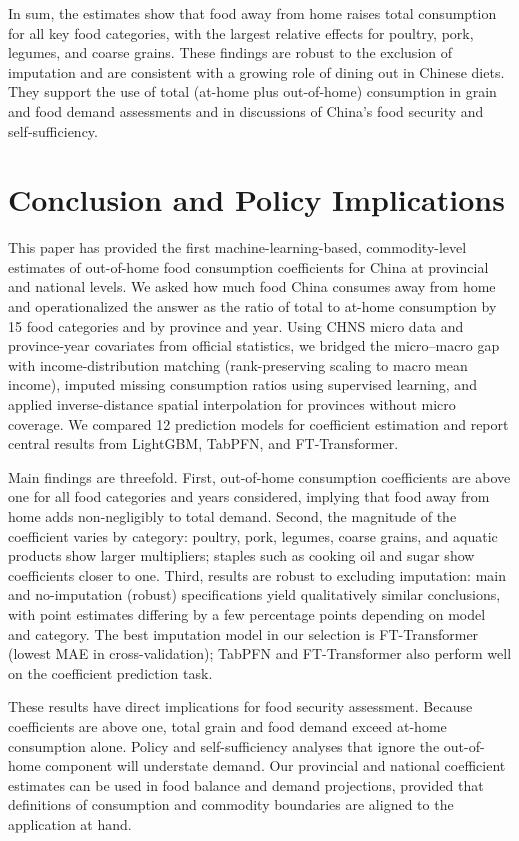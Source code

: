 \documentclass[12pt,a4paper]{article}
\begin{document}
In sum, the estimates show that food away from home raises total consumption for all key food categories, with the largest relative effects for poultry, pork, legumes, and coarse grains. These findings are robust to the exclusion of imputation and are consistent with a growing role of dining out in Chinese diets. They support the use of total (at-home plus out-of-home) consumption in grain and food demand assessments and in discussions of China's food security and self-sufficiency.

\section{Conclusion and Policy Implications}
\label{sec:conclusion}

This paper has provided the first machine-learning-based, commodity-level estimates of out-of-home food consumption coefficients for China at provincial and national levels. We asked how much food China consumes away from home and operationalized the answer as the ratio of total to at-home consumption by 15 food categories and by province and year. Using CHNS micro data and province-year covariates from official statistics, we bridged the micro--macro gap with income-distribution matching (rank-preserving scaling to macro mean income), imputed missing consumption ratios using supervised learning, and applied inverse-distance spatial interpolation for provinces without micro coverage. We compared 12 prediction models for coefficient estimation and report central results from LightGBM, TabPFN, and FT-Transformer.

Main findings are threefold. First, out-of-home consumption coefficients are above one for all food categories and years considered, implying that food away from home adds non-negligibly to total demand. Second, the magnitude of the coefficient varies by category: poultry, pork, legumes, coarse grains, and aquatic products show larger multipliers; staples such as cooking oil and sugar show coefficients closer to one. Third, results are robust to excluding imputation: main and no-imputation (robust) specifications yield qualitatively similar conclusions, with point estimates differing by a few percentage points depending on model and category. The best imputation model in our selection is FT-Transformer (lowest MAE in cross-validation); TabPFN and FT-Transformer also perform well on the coefficient prediction task.

These results have direct implications for food security assessment. Because coefficients are above one, total grain and food demand exceed at-home consumption alone. Policy and self-sufficiency analyses that ignore the out-of-home component will understate demand. Our provincial and national coefficient estimates can be used in food balance and demand projections, provided that definitions of consumption and commodity boundaries are aligned to the application at hand.
\end{document}
